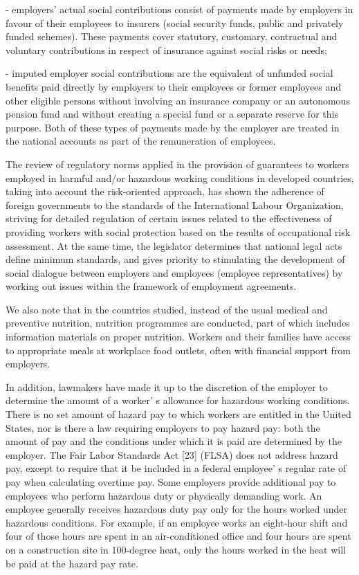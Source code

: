 \begin{multicols}{2}
- employers'{} actual social contributions consist of
payments made by employers in favour of their employees to insurers
(social security funds, public and privately funded schemes). These
payments cover statutory, customary, contractual and voluntary
contributions in respect of insurance against social risks or needs;

- imputed employer social contributions are the equivalent of unfunded
social benefits paid directly by employers to their employees or former
employees and other eligible persons without involving an insurance
company or an autonomous pension fund and without creating a special
fund or a separate reserve for this purpose. Both of these types of
payments made by the employer are treated in the national accounts as
part of the remuneration of employees.

The review of regulatory norms applied in the provision of guarantees to
workers employed in harmful and/or hazardous working conditions in
developed countries, taking into account the risk-oriented approach, has
shown the adherence of foreign governments to the standards of the
International Labour Organization, striving for detailed regulation of
certain issues related to the effectiveness of providing workers with
social protection based on the results of occupational risk assessment.
At the same time, the legislator determines that national legal acts
define minimum standards, and gives priority to stimulating the
development of social dialogue between employers and employees (employee
representatives) by working out issues within the framework of
employment agreements.

We also note that in the countries studied, instead of the usual medical
and preventive nutrition, nutrition programmes are conducted, part of
which includes information materials on proper nutrition. Workers and
their families have access to appropriate meals at workplace food
outlets, often with financial support from employers.

In addition, lawmakers have made it up to the discretion of the employer
to determine the amount of a worker' s allowance for
hazardous working conditions. There is no set amount of hazard pay to
which workers are entitled in the United States, nor is there a law
requiring employers to pay hazard pay: both the amount of pay and the
conditions under which it is paid are determined by the employer. The
Fair Labor Standards Act {[}23{]} (FLSA) does not address hazard pay,
except to require that it be included in a federal
employee' s regular rate of pay when calculating overtime
pay. Some employers provide additional pay to employees who perform
hazardous duty or physically demanding work. An employee generally
receives hazardous duty pay only for the hours worked under hazardous
conditions. For example, if an employee works an eight-hour shift and
four of those hours are spent in an air-conditioned office and four
hours are spent on a construction site in 100-degree heat, only the
hours worked in the heat will be paid at the hazard pay rate.


\end{multicols}
